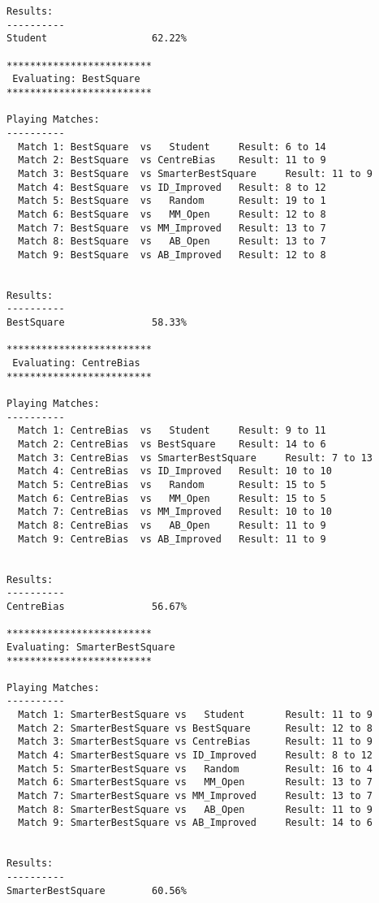 \documentclass{article}
\begin{document}
\begin{lstlisting}
Results:
----------
Student                  62.22%

*************************
 Evaluating: BestSquare  
*************************

Playing Matches:
----------
  Match 1: BestSquare  vs   Student     Result: 6 to 14
  Match 2: BestSquare  vs CentreBias    Result: 11 to 9
  Match 3: BestSquare  vs SmarterBestSquare     Result: 11 to 9
  Match 4: BestSquare  vs ID_Improved   Result: 8 to 12
  Match 5: BestSquare  vs   Random      Result: 19 to 1
  Match 6: BestSquare  vs   MM_Open     Result: 12 to 8
  Match 7: BestSquare  vs MM_Improved   Result: 13 to 7
  Match 8: BestSquare  vs   AB_Open     Result: 13 to 7
  Match 9: BestSquare  vs AB_Improved   Result: 12 to 8


Results:
----------
BestSquare               58.33%

*************************
 Evaluating: CentreBias  
*************************

Playing Matches:
----------
  Match 1: CentreBias  vs   Student     Result: 9 to 11
  Match 2: CentreBias  vs BestSquare    Result: 14 to 6
  Match 3: CentreBias  vs SmarterBestSquare     Result: 7 to 13
  Match 4: CentreBias  vs ID_Improved   Result: 10 to 10
  Match 5: CentreBias  vs   Random      Result: 15 to 5
  Match 6: CentreBias  vs   MM_Open     Result: 15 to 5
  Match 7: CentreBias  vs MM_Improved   Result: 10 to 10
  Match 8: CentreBias  vs   AB_Open     Result: 11 to 9
  Match 9: CentreBias  vs AB_Improved   Result: 11 to 9


Results:
----------
CentreBias               56.67%

*************************
Evaluating: SmarterBestSquare
*************************

Playing Matches:
----------
  Match 1: SmarterBestSquare vs   Student       Result: 11 to 9
  Match 2: SmarterBestSquare vs BestSquare      Result: 12 to 8
  Match 3: SmarterBestSquare vs CentreBias      Result: 11 to 9
  Match 4: SmarterBestSquare vs ID_Improved     Result: 8 to 12
  Match 5: SmarterBestSquare vs   Random        Result: 16 to 4
  Match 6: SmarterBestSquare vs   MM_Open       Result: 13 to 7
  Match 7: SmarterBestSquare vs MM_Improved     Result: 13 to 7
  Match 8: SmarterBestSquare vs   AB_Open       Result: 11 to 9
  Match 9: SmarterBestSquare vs AB_Improved     Result: 14 to 6


Results:
----------
SmarterBestSquare        60.56%
\end{lstlisting}
\end{document}
